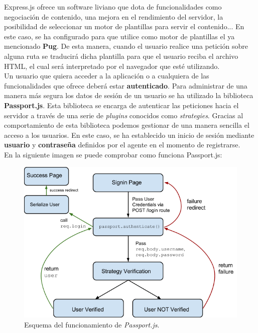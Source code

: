 Express.js ofrece un software liviano que dota de funcionalidades como negociación de contenido, una mejora en el 
rendimiento del servidor, la posibilidad de seleccionar un motor de plantillas para servir el contenido... En este caso,
se ha configurado para que utilice como motor de plantillas el ya mencionado \textbf{Pug}. De esta manera, cuando el usuario
realice una petición sobre alguna ruta se traducirá dicha plantilla para que el usuario reciba el archivo HTML, el cual
será interpretado por el navegador que esté utilizando.\\ 

Un usuario que quiera acceder a la aplicación o a cualquiera de las funcionalidades que ofrece deberá estar \textbf{autenticado}.
Para administrar de una manera más segura los datos de sesión de un usuario se ha utilizado la biblioteca \textbf{Passport.js}\cite{passport}.
Esta biblioteca se encarga de autenticar las peticiones hacia el servidor a través de una serie de \textit{plugins} conocidos
como \textit{strategies}. Gracias al comportamiento de esta biblioteca podemos gestionar de una manera sencilla el acceso a los usuarios.
En este caso, se ha establecido un inicio de sesión mediante \textbf{usuario} y \textbf{contraseña} definidos por el agente en el 
momento de registrarse.\\

En la siguiente imagen se puede comprobar como funciona Passport.js:
\begin{figure}[H]
	\centering
	\includegraphics[scale=0.65]{imagenes/passport-auth.png}
	\caption{Esquema del funcionamiento de \textit{Passport.js}\cite{passport-func}. \label{fig:figura18}}
\end{figure}


